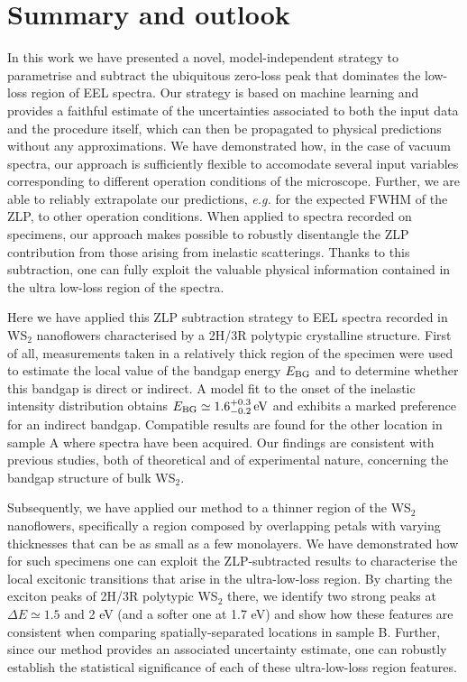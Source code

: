 \section{Summary and outlook}
\label{sec:summary}

In this work we have presented a novel, model-independent strategy to parametrise and subtract
the ubiquitous zero-loss peak that dominates  the low-loss region
of EEL spectra.
%
Our strategy is based on machine learning and provides a faithful estimate of the
uncertainties associated to both the input data and the procedure itself,
which can  then be propagated to physical predictions  without any  approximations.
%
We have demonstrated how, in the case of vacuum spectra, our approach
is sufficiently flexible to accomodate several input variables corresponding
to different operation conditions of the microscope.
%
Further, we are able  to reliably
extrapolate our predictions, {\it e.g.} for the  expected FWHM of the ZLP,
to other operation conditions.
%
When applied to spectra recorded on specimens, our approach
makes possible to robustly disentangle the ZLP contribution from
those arising from inelastic scatterings.
%
Thanks to this subtraction, one can fully exploit
the valuable physical information contained in the ultra low-loss region of
the spectra.

Here we have applied this ZLP subtraction
strategy to EEL spectra recorded in  WS$_2$ nanoflowers characterised by a
2H/3R polytypic crystalline structure.
%
First of all, measurements taken in a relatively
thick region of the specimen were used to estimate the local value of the bandgap energy $E_{\rm BG}$
and to determine whether this bandgap is direct or indirect.
%
A model fit to the onset of the inelastic intensity distribution obtains
$E_{\rm BG} \simeq 1.6^{+0.3}_{-0.2}\,{\rm eV}$ and exhibits a marked preference for an indirect bandgap.
%
Compatible results are found for the other location
in sample A where spectra have been acquired.
%
Our findings are consistent with previous studies, both of theoretical
and of experimental nature, concerning the bandgap structure of bulk WS$_2$.

Subsequently, we have applied our method to a  thinner region of the  WS$_2$ nanoflowers,
specifically a region composed by overlapping petals with varying
thicknesses that can be as small as a few monolayers.
%
We have demonstrated how for such specimens one can exploit the ZLP-subtracted results
to characterise the local excitonic transitions that arise in the ultra-low-loss region.
%
By charting the exciton peaks of 2H/3R polytypic WS$_2$ there,
we identify two strong peaks at $\Delta E\simeq 1.5$ and 2 eV
(and a softer one at 1.7 eV) and show how
these features are consistent when comparing
spatially-separated locations in sample B.
%
Further, since our method provides an associated uncertainty estimate,
one can robustly establish the
statistical significance of each of these
ultra-low-loss region features.

